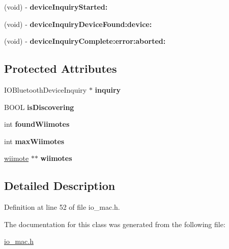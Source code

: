 \begin{DoxyCompactItemize}
\item 
\hypertarget{interface_wii_search_ade01f115383cdd698af8927f28f63b1d}{(void) -\/ {\bfseries device\-Inquiry\-Started\-:}}\label{interface_wii_search_ade01f115383cdd698af8927f28f63b1d}

\item 
\hypertarget{interface_wii_search_a0657d3778a59f06a7e88f384bcbdef15}{(void) -\/ {\bfseries device\-Inquiry\-Device\-Found\-:device\-:}}\label{interface_wii_search_a0657d3778a59f06a7e88f384bcbdef15}

\item 
\hypertarget{interface_wii_search_ad98054ad882cc29eb6f216cd0bcddb0b}{(void) -\/ {\bfseries device\-Inquiry\-Complete\-:error\-:aborted\-:}}\label{interface_wii_search_ad98054ad882cc29eb6f216cd0bcddb0b}

\end{DoxyCompactItemize}
\subsection*{Protected Attributes}
\begin{DoxyCompactItemize}
\item 
\hypertarget{interface_wii_search_a90d49084a8c785eed6002794e884a58a}{I\-O\-Bluetooth\-Device\-Inquiry $\ast$ {\bfseries inquiry}}\label{interface_wii_search_a90d49084a8c785eed6002794e884a58a}

\item 
\hypertarget{interface_wii_search_a975efbb9edea1f450ea2219ea39da6f8}{B\-O\-O\-L {\bfseries is\-Discovering}}\label{interface_wii_search_a975efbb9edea1f450ea2219ea39da6f8}

\item 
\hypertarget{interface_wii_search_a5c1c217bc608641c4f8ff1d4818774eb}{int {\bfseries found\-Wiimotes}}\label{interface_wii_search_a5c1c217bc608641c4f8ff1d4818774eb}

\item 
\hypertarget{interface_wii_search_ab13e41ad50369c11d865f2f5ce2bd007}{int {\bfseries max\-Wiimotes}}\label{interface_wii_search_ab13e41ad50369c11d865f2f5ce2bd007}

\item 
\hypertarget{interface_wii_search_aeb962f3f862b4bbf85e62cd4d68fd2cd}{\hyperlink{structwiimote__t}{wiimote} $\ast$$\ast$ {\bfseries wiimotes}}\label{interface_wii_search_aeb962f3f862b4bbf85e62cd4d68fd2cd}

\end{DoxyCompactItemize}


\subsection{Detailed Description}


Definition at line 52 of file io\-\_\-mac.\-h.



The documentation for this class was generated from the following file\-:\begin{DoxyCompactItemize}
\item 
\hyperlink{io__mac_8h}{io\-\_\-mac.\-h}\end{DoxyCompactItemize}
